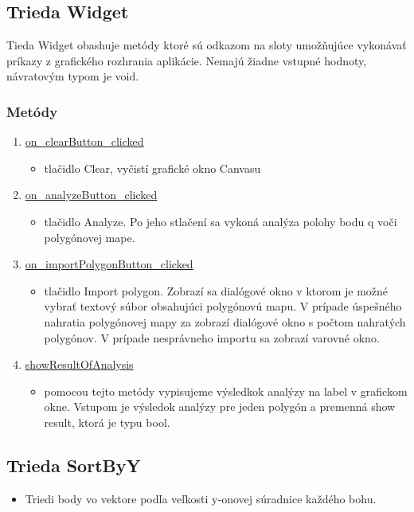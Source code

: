\documentclass[12pt]{article}
\begin{document}
\subsection{Trieda Widget}
Tieda Widget obashuje metódy ktoré sú odkazom na sloty umožňujúce vykonávať príkazy z grafického rozhrania aplikácie. Nemajú žiadne vstupné hodnoty, návratovým typom je void.

\subsubsection{Metódy}
\begin{enumerate}
\item[] \underline{on\_clearButton\_clicked}
\begin{itemize}
\item tlačidlo Clear, vyčistí grafické okno Canvasu
\end{itemize}
\item[] \underline{on\_analyzeButton\_clicked}
\begin{itemize}
\item tlačidlo Analyze. Po jeho stlačení sa vykoná analýza polohy bodu q voči polygónovej mape.
\end{itemize}
\item[] \underline{on\_importPolygonButton\_clicked}
\begin{itemize}
\item tlačidlo Import polygon. Zobrazí sa dialógové okno v ktorom je možné vybrať textový súbor obsahujúci polygónovú mapu. V prípade úspešného nahratia polygónovej mapy za zobrazí dialógové okno s počtom nahratých polygónov. V prípade nesprávneho importu sa zobrazí varovné okno.
\end{itemize}
\item[] \underline{showResultOfAnalysis}
\begin{itemize}
\item pomocou tejto metódy vypisujeme výsledkok analýzy na label v grafickom okne. Vstupom je výsledok analýzy pre jeden polygón a premenná show result, ktorá je typu bool.
\end{itemize}
\end{enumerate}

\subsection{Trieda SortByY}
\begin{itemize}
\item Triedi body vo vektore podľa veľkosti y-onovej súradnice každého bohu. 
\end{itemize}
\end{document}
